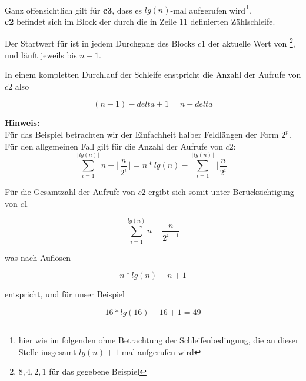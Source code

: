 \\

Ganz offensichtlich gilt für \textbf{c3}, dass es $lg(n)$-mal aufgerufen wird\footnote{hier wie im folgenden ohne Betrachtung der Schleifenbedingung, die an dieser Stelle insgesamt $lg(n) + 1$-mal aufgerufen wird}.
\\

\textbf{c2} befindet sich im Block der durch die in Zeile 11 definierten Zählschleife.

Der Startwert für  ist in jedem Durchgang des Blocks $c1$ der aktuelle Wert von \footnote{${8, 4, 2, 1}$ für das gegebene Beispiel}, und läuft jeweils bis $n - 1$.

In einem kompletten Durchlauf der Schleife enstpricht die Anzahl der Aufrufe von $c2$ also

\begin{equation}
(n - 1) - delta + 1 = n - delta
\end{equation}

\begin{tcolorbox}
    \textbf{Hinweis:}
    \\
    Für das Beispiel betrachten wir der Einfachheit halber Feldlängen der Form $2^p$.
    \\
    Für den allgemeinen Fall gilt für die Anzahl der Aufrufe von $c2$:\\

    \begin{equation}
        \nonumber
        \sum_{i=1}^{\lfloor lg(n) \rfloor} n - \lfloor \frac{n}{2^i} \rfloor = n * lg(n) - \sum_{i=1}^{\lfloor lg(n) \rfloor} \lfloor \frac{n}{2^i} \rfloor
    \end{equation}
\end{tcolorbox}

Für die  Gesamtzahl der Aufrufe von $c2$ ergibt sich somit unter Berücksichtigung von $c1$

\begin{equation}
\sum_{i=1}^{lg(n)} n - \frac{n}{2^{i-1}}
\end{equation}

was nach Auflösen

\begin{equation}
    n * lg(n) - n + 1
\end{equation}

entspricht, und für unser Beispiel

\begin{equation}
    16 * lg(16) - 16 + 1 = 49
\end{equation}

